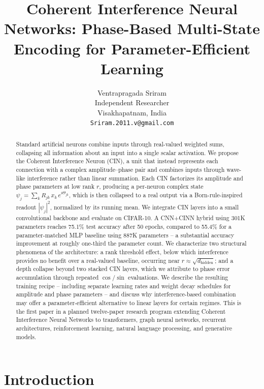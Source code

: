 \documentclass[11pt]{article}
\title{Coherent Interference Neural Networks: Phase-Based Multi-State Encoding for Parameter-Efficient Learning}
\author{
  Ventrapragada Sriram \\
  Independent Researcher \\
  Visakhapatnam, India \\
  \texttt{Sriram.2011.v@gmail.com}
}
\begin{document}
\maketitle

\begin{abstract}
Standard artificial neurons combine inputs through real-valued weighted sums, collapsing all information about an input into a single scalar activation. We propose the Coherent Interference Neuron (CIN), a unit that instead represents each connection with a complex amplitude--phase pair and combines inputs through wave-like interference rather than linear summation. Each CIN factorizes its amplitude and phase parameters at low rank $r$, producing a per-neuron complex state $\psi_j = \sum_k R_{jk} \, x_k \, e^{i\Theta_{jk}}$, which is then collapsed to a real output via a Born-rule-inspired readout $|\psi_j|^2$, normalized by its running mean. We integrate CIN layers into a small convolutional backbone and evaluate on CIFAR-10. A CNN+CINN hybrid using 301K parameters reaches 75.1\% test accuracy after 50 epochs, compared to 55.4\% for a parameter-matched MLP baseline using 887K parameters -- a substantial accuracy improvement at roughly one-third the parameter count. We characterize two structural phenomena of the architecture: a rank threshold effect, below which interference provides no benefit over a real-valued baseline, occurring near $r \approx \sqrt{d_{\text{hidden}}}$; and a depth collapse beyond two stacked CIN layers, which we attribute to phase error accumulation through repeated $\cos/\sin$ evaluations. We describe the resulting training recipe -- including separate learning rates and weight decay schedules for amplitude and phase parameters -- and discuss why interference-based combination may offer a parameter-efficient alternative to linear layers for certain regimes. This is the first paper in a planned twelve-paper research program extending Coherent Interference Neural Networks to transformers, graph neural networks, recurrent architectures, reinforcement learning, natural language processing, and generative models.
\end{abstract}


\section{Introduction}
\label{sec:intro}
\end{document}
